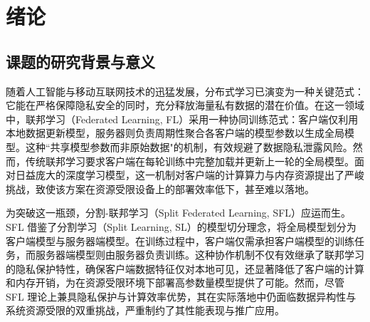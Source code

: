 
\chapter{绪论}
\section{课题的研究背景与意义}
随着人工智能与移动互联网技术的迅猛发展，分布式学习已演变为一种关键范式：它能在严格保障隐私安全的同时，充分释放海量私有数据的潜在价值。在这一领域中，联邦学习（Federated Learning, FL）采用一种协同训练范式：客户端仅利用本地数据更新模型，服务器则负责周期性聚合各客户端的模型参数以生成全局模型。这种``共享模型参数而非原始数据"的机制，有效规避了数据隐私泄露风险。然而，传统联邦学习要求客户端在每轮训练中完整加载并更新上一轮的全局模型。面对日益庞大的深度学习模型，这一机制对客户端的计算算力与内存资源提出了严峻挑战，致使该方案在资源受限设备上的部署效率低下，甚至难以落地。


为突破这一瓶颈，分割-联邦学习（Split Federated Learning, SFL）应运而生。SFL 借鉴了分割学习（Split Learning, SL）的模型切分理念，将全局模型划分为客户端模型与服务器端模型。在训练过程中，客户端仅需承担客户端模型的训练任务，而服务器端模型则由服务器负责训练。这种协作机制不仅有效继承了联邦学习的隐私保护特性，确保客户端数据特征仅对本地可见，还显著降低了客户端的计算和内存开销，为在资源受限环境下部署高参数量模型提供了可能。然而，尽管 SFL 理论上兼具隐私保护与计算效率优势，其在实际落地中仍面临数据异构性与系统资源受限的双重挑战，严重制约了其性能表现与推广应用。



